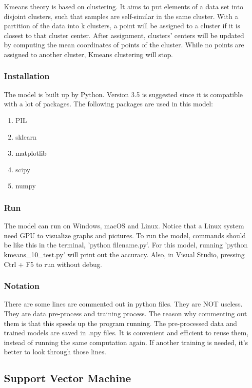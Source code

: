 \documentclass[10pt,journal,compsoc, draftclsnofoot,onecolumn]{IEEEtran}
\begin{document}
\noindent
Kmeans theory is based on clustering. It aims to put elements of a data set into disjoint clusters, such that samples are self-similar in the same cluster. With a partition of the data into k clusters, a point will be assigned to a cluster if it is closest to that cluster center. After assignment, clusters' centers will be updated by computing the mean coordinates of points of the cluster. While no points are assigned to another cluster, Kmeans clustering will stop.

\subsubsection{Installation}
The model is built up by Python. Version 3.5 is suggested since it is compatible with a lot of packages. The following packages are used in this model:
\begin{enumerate}
\item PIL
\item sklearn
\item matplotlib
\item scipy
\item numpy
\end{enumerate}

\subsubsection{Run}
The model can run on Windows, macOS and Linux. Notice that a Linux system need GPU to visualize graphs and pictures. To run the model, commands should be like this in the terminal, 'python filename.py'. For this model, running 'python kmeans\_10\_test.py' will print out the accuracy. Also, in Visual Studio, pressing Ctrl + F5 to run without debug. 

\subsubsection{Notation}
There are some lines are commented out in python files. They are NOT useless. They are data pre-process and training process. The reason why commenting out them is that this speeds up the program running. The pre-processed data and trained models are saved in .npy files. It is convenient and efficient to reuse them, instead of running the same computation again. If another training is needed, it's better to look through those lines. 


\subsection{Support Vector Machine}
\end{document}
